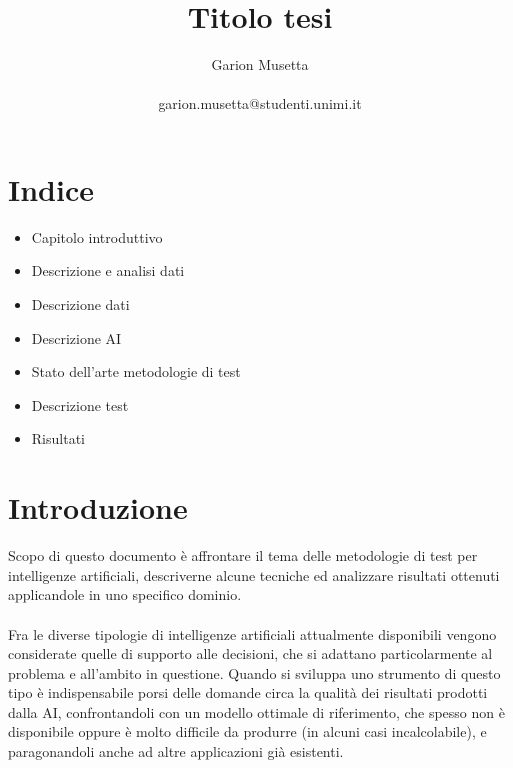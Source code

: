 \documentclass{article}
\title{\textbf{Titolo tesi}}
\author{Garion Musetta\\~\\garion.musetta@studenti.unimi.it}
\begin{document}
	\maketitle   
	 
	\section{Indice}
	\begin{itemize}
		\item Capitolo introduttivo
			\item Descrizione e analisi dati
			\item Descrizione dati
		\item Descrizione AI
		\item Stato dell'arte metodologie di test
		\item Descrizione test
		\item Risultati
	\end{itemize}
	 
	 
	 
   	\section{Introduzione }
		Scopo di questo documento è affrontare il tema delle metodologie di test per intelligenze artificiali, descriverne alcune tecniche ed analizzare risultati ottenuti applicandole in uno specifico dominio.
		\\~\\
		Fra le diverse tipologie di intelligenze artificiali attualmente disponibili vengono considerate quelle di supporto alle decisioni, che si adattano particolarmente al problema e all'ambito in questione. Quando si sviluppa uno strumento di questo tipo è indispensabile porsi delle domande circa la qualità dei risultati prodotti dalla AI, confrontandoli con un modello ottimale di riferimento, che spesso non è disponibile oppure è molto difficile da produrre (in alcuni casi incalcolabile), e paragonandoli anche ad altre applicazioni già esistenti.
\end{document}
